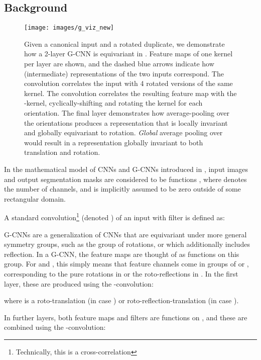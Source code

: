 \documentclass{llncs}
\begin{document}
\subsection{Background}
\begin{figure}[t]
\centerline{\texttt{[image: images/g\_viz\_new]}}
\caption{Given a canonical input and a rotated duplicate, we demonstrate how a 2-layer G-CNN is equivariant in . Feature maps of one kernel per layer are shown, and the dashed blue arrows indicate how (intermediate) representations of the two inputs correspond. The  convolution correlates the input with 4 rotated versions of the same kernel. The  convolution correlates the resulting feature map with the -kernel, cyclically-shifting and rotating the kernel for each orientation. The final layer demonstrates how average-pooling over the orientations produces a representation that is locally invariant and globally equivariant to rotation. \textit{Global} average pooling over  would result in a representation globally invariant to both translation and rotation. }\label{fig:patho_equiv}

\end{figure}
In the mathematical model of CNNs and G-CNNs introduced in \cite{Cohen2016-do}, input images and output segmentation masks are considered to be functions , where  denotes the number of channels, and  is implicitly assumed to be zero outside of some rectangular domain.

A standard convolution\footnote{Technically, this is a cross-correlation} (denoted ) of an input  with filter  is defined as:




G-CNNs are a generalization of CNNs that are equivariant under more general symmetry groups, such as the group  of  rotations, or  which additionally includes reflection.
In a G-CNN, the feature maps are thought of as functions on this group.
For  and , this simply means that feature channels come in groups of  or , corresponding to the  pure rotations in  or the  roto-reflections in .
In the first layer, these are produced using the -convolution:

where  is a roto-translation (in case ) or roto-reflection-translation (in case ).




In further layers, both feature maps and filters are functions on , and these are combined using the -convolution:
\end{document}
